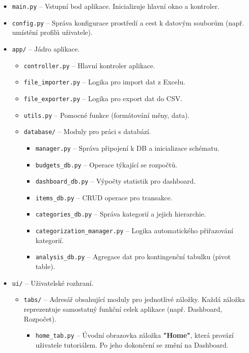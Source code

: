 \documentclass[
program=itk,
biblatex,
language=czech,
font=sans,
figures=true,
tables=false,
sourcecodes=false,
glossaries,
index
]{kidiplom}
\begin{document}
\begin{itemize}
    \item \texttt{main.py} – Vstupní bod aplikace. Inicializuje hlavní okno a kontroler.
    \item \texttt{config.py} – Správa konfigurace prostředí a cest k datovým souborům (např. umístění profilů uživatele).
    \item \texttt{app/} – Jádro aplikace.
    \begin{itemize}
        \item \texttt{controller.py} – Hlavní kontroler aplikace.
        \item \texttt{file\_importer.py} – Logika pro import dat z Excelu.
        \item \texttt{file\_exporter.py} – Logika pro export dat do CSV.
        \item \texttt{utils.py} – Pomocné funkce (formátování měny, data).
        \item \texttt{database/} – Moduly pro práci s databází.
        \begin{itemize}
            \item \texttt{manager.py} – Správa připojení k DB a inicializace schématu.
            \item \texttt{budgets\_db.py} – Operace týkající se rozpočtů.
            \item \texttt{dashboard\_db.py} – Výpočty statistik pro dashboard.
            \item \texttt{items\_db.py} – CRUD operace pro transakce.
            \item \texttt{categories\_db.py} – Správa kategorií a jejich hierarchie.
            \item \texttt{categorization\_manager.py} – Logika automatického přiřazování kategorií.
            \item \texttt{analysis\_db.py} – Agregace dat pro kontingenční tabulku (pivot table).
        \end{itemize}
    \end{itemize}
    \item \texttt{ui/} – Uživatelské rozhraní.
    \begin{itemize}
        \item \texttt{tabs/} – Adresář obsahující moduly pro jednotlivé záložky. Každá záložka reprezentuje samostatný funkční celek aplikace (např. Dashboard, Rozpočet).
        \begin{itemize}
            \item \texttt{home\_tab.py} – Úvodní obrazovka záložka \textbf{"Home"}, která provází uživatele tutoriálem. Po jeho dokončení se změní na Dashboard.

\end{itemize}
\end{itemize}
\end{itemize}
\end{document}
